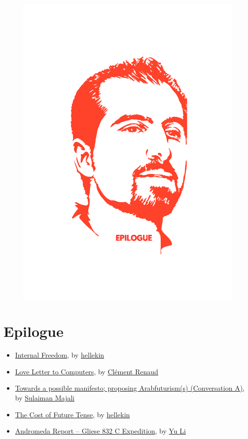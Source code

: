 \begin{figure}[htbp]
\centering
\includegraphics{../../images/cost-of-freedom-epilogue.jpg}
\caption{}
\end{figure}

\section{Epilogue}\label{epilogue}

\begin{itemize}
\tightlist
\item
  \href{internal-freedom.html}{Internal Freedom}, by
  \href{../appendix/attributions.html\#hellekin}{hellekin}
\item
  \href{love-letter-to-computers.html}{Love Letter to Computers}, by
  \href{../appendix/attributions.html\#clement-renaud}{Clément Renaud}
\item
  \href{arabfuturisms-conversation-a.html}{Towards a possible manifesto;
  proposing Arabfuturism(s) (Conversation A)}, by
  \href{../appendix/attributions.html\#sulaiman-majali}{Sulaiman Majali}
\item
  \href{the-cost-of-future-tense.html}{The Cost of Future Tense}, by
  \href{../appendix/attributions.html\#hellekin}{hellekin}
\item
  \href{andromeda-report-gliese-832-c-expedition.html}{Andromeda Report
  -- Gliese 832 C Expedition}, by
  \href{../appendix/attributions.html\#yu-li}{Yu Li}
\end{itemize}
